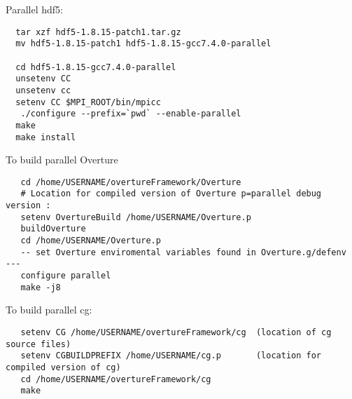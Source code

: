 \bigskip\noindent
Parallel hdf5:
\begin{verbatim}
  tar xzf hdf5-1.8.15-patch1.tar.gz
  mv hdf5-1.8.15-patch1 hdf5-1.8.15-gcc7.4.0-parallel

  cd hdf5-1.8.15-gcc7.4.0-parallel
  unsetenv CC
  unsetenv cc
  setenv CC $MPI_ROOT/bin/mpicc
   ./configure --prefix=`pwd` --enable-parallel
  make
  make install
\end{verbatim}

\bigskip\noindent
To build parallel Overture
\begin{verbatim}
   cd /home/USERNAME/overtureFramework/Overture
   # Location for compiled version of Overture p=parallel debug version : 
   setenv OvertureBuild /home/USERNAME/Overture.p    
   buildOverture
   cd /home/USERNAME/Overture.p 
   -- set Overture enviromental variables found in Overture.g/defenv  ---
   configure parallel
   make -j8    
\end{verbatim}

\bigskip\noindent
To build parallel cg:
\begin{verbatim}
   setenv CG /home/USERNAME/overtureFramework/cg  (location of cg source files)
   setenv CGBUILDPREFIX /home/USERNAME/cg.p       (location for compiled version of cg)
   cd /home/USERNAME/overtureFramework/cg
   make   
\end{verbatim}


